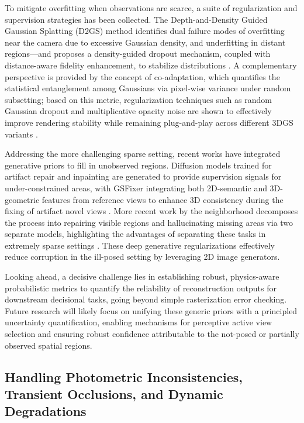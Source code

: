 \documentclass[11pt,a4paper]{article}
\begin{document}
To mitigate overfitting when observations are scarce, a suite of regularization and supervision strategies has been collected. The Depth-and-Density Guided Gaussian Splatting (D2GS) method identifies dual failure modes of overfitting near the camera due to excessive Gaussian density, and underfitting in distant regions---and proposes a density-guided dropout mechanism, coupled with distance-aware fidelity enhancement, to stabilize distributions \cite{arxiv:2510.08566v1}. A complementary perspective is provided by the concept of co-adaptation, which quantifies the statistical entanglement among Gaussians via pixel-wise variance under random subsetting; based on this metric, regularization techniques such as random Gaussian dropout and multiplicative opacity noise are shown to effectively improve rendering stability while remaining plug-and-play across different 3DGS variants \cite{arxiv:2508.12720v3}.

Addressing the more challenging sparse setting, recent works have integrated generative priors to fill in unobserved regions. Diffusion models trained for artifact repair and inpainting are generated to provide supervision signals for under-constrained areas, with GSFixer integrating both 2D-semantic and 3D-geometric features from reference views to enhance 3D consistency during the fixing of artifact novel views \cite{arxiv:2508.09667v1}. More recent work by the neighborhood decomposes the process into repairing visible regions and hallucinating missing areas via two separate models, highlighting the advantages of separating these tasks in extremely sparse settings \cite{arxiv:2503.10860v2}. These deep generative regularizations effectively reduce corruption in the ill-posed setting by leveraging 2D image generators.

Looking ahead, a decisive challenge lies in establishing robust, physics-aware probabilistic metrics to quantify the reliability of reconstruction outputs for downstream decisional tasks, going beyond simple rasterization error checking. Future research will likely focus on unifying these generic priors with a principled uncertainty quantification, enabling mechanisms for perceptive active view selection and ensuring robust confidence attributable to the not-posed or partially observed spatial regions.


\subsection{Handling Photometric Inconsistencies, Transient Occlusions, and Dynamic Degradations}
\end{document}
